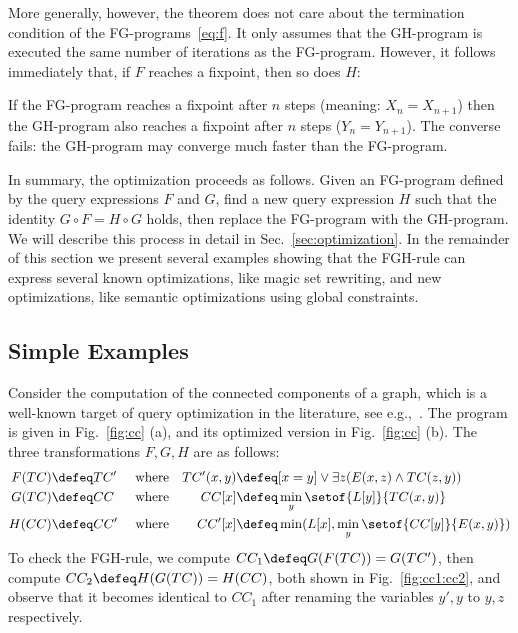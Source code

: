 More generally, however, the theorem does not care about the
termination condition of the FG-programs~\eqref{eq:f}. It only assumes
that the GH-program is executed the same number of iterations as the
FG-program.  However, it follows immediately that, if $F$ reaches a
fixpoint, then so does $H$:

\begin{corollary} \label{cor:number:iterations}
  If the FG-program reaches a fixpoint after $n$ steps (meaning:
  $X_n=X_{n+1}$) then the GH-program also reaches a fixpoint after $n$
  steps ($Y_n = Y_{n+1}$).  The converse fails: the GH-program may
  converge much faster than the FG-program.
\end{corollary}



In summary, the optimization proceeds as follows.  Given an FG-program
defined by the query expressions $F$ and $G$, find a new query
expression $H$ such that the identity $G\circ F = H \circ G$ holds,
then replace the FG-program with the GH-program.  We will describe
this process in detail in Sec.~\ref{sec:optimization}.  In the
remainder of this section we present several examples showing that the
FGH-rule can express several known optimizations, like magic set
rewriting, and new optimizations, like semantic optimizations using
global constraints.


\subsection{Simple Examples}

\label{subsec:simple:examples}


\begin{ex}\label{ex:fgh:cc} Consider the
computation of the connected components of a graph, which
is a well-known target of query optimization in the literature, 
see e.g.,~\cite{DBLP:conf/amw/ZanioloYIDSC18}.
%
The program is given in Fig.~\ref{fig:cc} (a), and its optimized version
  in Fig.~\ref{fig:cc} (b).  The three transformations $F,G,H$ are as follows:
%
{\footnotesize
  \begin{align*}
    F(TC) \defeq & TC' &&\mbox{ where}&  TC'(x,y) \defeq & [x=y] \vee \exists z(E(x,z) \wedge TC(z,y))\\
    G(TC) \defeq & CC  &&\mbox{ where}&  CC[x] \defeq & \min_y \setof{L[y]}{TC(x,y)}\\
    H(CC) \defeq & CC' &&\mbox{ where}&  CC'[x] \defeq & \min(L[x], \min_y \setof{CC[y]}{E(x,y)})
  \end{align*}
}
%
To check the FGH-rule, we compute $CC_1 \defeq G(F(TC)) = G(TC')$,
then compute
$CC_2 \defeq H(G(TC)) = H(CC)$, both shown in Fig.~\ref{fig:cc1:cc2}, and
observe that it becomes identical to $CC_1$ after renaming the
variables $y',y$ to $y,z$ respectively.
\end{ex}

